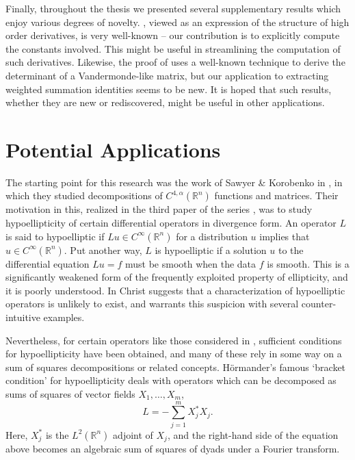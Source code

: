 \documentclass[oneside,hidelinks,indentfirst,10pt]{book}
\begin{document}
Finally, throughout the thesis we presented several supplementary results which enjoy various degrees of novelty. , viewed as an expression of the structure of high order derivatives, is very well-known -- our contribution is to explicitly compute the constants involved. This might be useful in streamlining the computation of such derivatives. Likewise, the proof of  uses a well-known technique to derive the determinant of a Vandermonde-like matrix, but our application to extracting weighted summation identities seems to be new. It is hoped that such results, whether they are new or rediscovered, might be useful in other applications.


\section{Potential Applications}\label{sec:hypoelliptchap}


The starting point for this research was the work of Sawyer \& Korobenko in \cite{SOS_I}, in which they studied decompositions of \(C^{4,\alpha}(\mathbb{R}^n)\) functions and matrices. Their motivation in this, realized in the third paper of the series \cite{SOS_III}, was to study hypoellipticity of certain differential operators in divergence form. An operator \(L\) is said to hypoelliptic if \(Lu\in C^\infty(\mathbb{R}^n)\) for a distribution \(u\) implies that \(u\in C^\infty(\mathbb{R}^n)\). Put another way, \(L\) is hypoelliptic if a solution \(u\) to the differential equation \(Lu=f\) must be smooth when the data \(f\) is smooth. This is a significantly weakened form of the frequently exploited property of ellipticity, and it is poorly understood. In \cite{Christ_IDR} Christ suggests that a characterization of hypoelliptic operators is unlikely to exist, and warrants this suspicion with several counter-intuitive examples. 


Nevertheless, for certain operators like those considered in \cite{SOS_III}, sufficient conditions for hypoellipticity have been obtained, and many of these rely in some way on a sum of squares decompositions or related concepts. H\"ormander's famous `bracket condition' for hypoellipticity deals with operators which can be decomposed as sums of squares of vector fields \(X_1,\dots,X_m\),
\[
    L=-\sum_{j=1}^m X_j^*X_j.   
\]
Here, \(X_j^*\) is the \(L^2(\mathbb{R}^n)\) adjoint of \(X_j\), and the right-hand side of the equation above becomes an algebraic sum of squares of dyads under a Fourier transform. 
\end{document}
